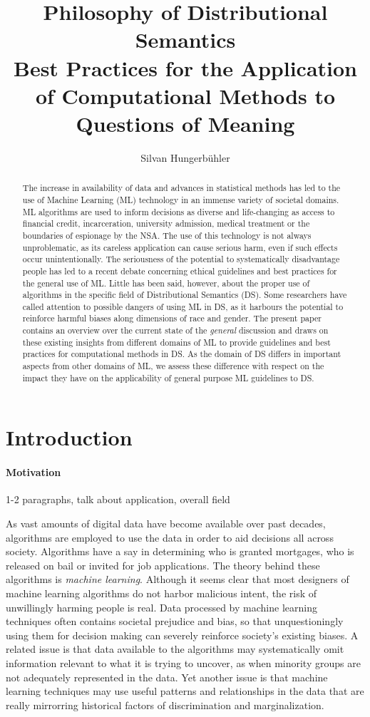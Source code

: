 \documentclass{article}
\title{Philosophy of Distributional Semantics\\
\large Best Practices for the Application of Computational Methods to Questions of Meaning}
\date{}
\author{Silvan Hungerb{\"u}hler}
\begin{document}
\maketitle
\begin{abstract}
The increase in availability of data and advances in statistical methods has led to the use of Machine Learning (ML) technology in an immense variety of societal domains. ML algorithms are used to inform decisions as diverse and life-changing as access to financial credit, incarceration, university admission, medical treatment or the boundaries of espionage by the NSA.
The use of this technology is not always unproblematic, as its careless application can cause serious harm, even if such effects occur unintentionally.
The seriousness of the potential to systematically disadvantage people has led to a recent debate concerning ethical guidelines and best practices for the general use of ML.
Little has been said, however, about the proper use of algorithms in the specific field of Distributional Semantics (DS). Some researchers have called attention to possible dangers of using ML in DS, as it harbours the potential to reinforce harmful biases along dimensions of race and gender.
The present paper contains an overview over the current state of the \emph{general} discussion 
and draws on these existing insights from different domains of ML to provide guidelines and best practices for computational methods in DS.
As the domain of DS differs in important aspects from other domains of ML, 
we assess these difference with respect on the impact they have on the applicability of general purpose ML guidelines to DS.
\end{abstract}
\section{Introduction}
\paragraph{Motivation}
1-2 paragraphs, talk about application, overall field

As vast amounts of digital data have become available over past decades, algorithms are employed to use the data in order to aid decisions all across society. 
Algorithms have a say in determining who is granted mortgages, who is released on bail or invited for job applications. 
\cite{algorithms2016}
The theory behind these algorithms is \emph{machine learning}.
Although it seems clear that most designers of machine learning algorithms do not harbor malicious intent, the risk of unwillingly harming people is real.
Data processed by machine learning techniques often contains societal prejudice and bias, so that unquestioningly using them for decision making can severely reinforce society's existing biases.
A related issue is that data available to the algorithms may systematically omit information relevant to what it is trying to uncover, as when minority groups are not adequately represented in the data.
Yet another issue is that machine learning techniques may use useful patterns and relationships in the data that are really mirrorring historical factors of discrimination and marginalization. \cite{barocas2016big}
\end{document}
